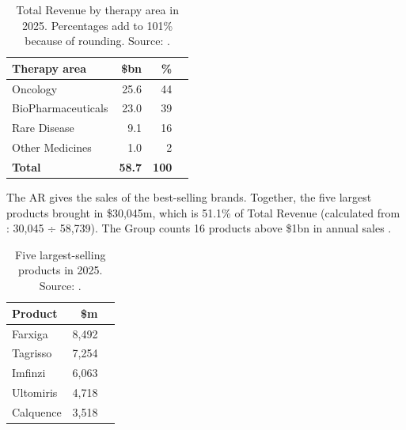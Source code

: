 \begin{table}[H]\centering
\caption{Total Revenue by therapy area in 2025. Percentages add to 101\% because of rounding. Source: \cite[p.~2]{AR}.}
\label{tab:receita-area}
\begin{tabular}{@{}lrrB@{}}
\toprule
\textbf{Therapy area} & \textbf{\$bn} & \textbf{\%} & \\
\midrule
Oncology            & 25.6 & 44 &  \\
BioPharmaceuticals  & 23.0 & 39 &  \\
Rare Disease        &  9.1 & 16 &  \\
Other Medicines     &  1.0 &  2 &  \\
\midrule
\textbf{Total}      & \textbf{58.7} & \textbf{100} & \\
\bottomrule
\end{tabular}
\end{table}
The AR gives the sales of the best-selling brands. Together, the five largest products brought in \$30,045m, which is 51.1\% of Total Revenue (calculated from \cite[p.~56]{AR}: 30,045 ÷ 58,739). The Group counts 16 products above \$1bn in annual sales \cite[p.~50]{AR}.

\begin{table}[H]\centering
\caption{Five largest-selling products in 2025. Source: \cite[p.~56]{AR}.}
\label{tab:top5}
\begin{tabular}{@{}lrB@{}}
\toprule
\textbf{Product} & \textbf{\$m} & \\
\midrule
Farxiga   & 8,492 &  \\
Tagrisso  & 7,254 &  \\
Imfinzi   & 6,063 &  \\
Ultomiris & 4,718 &  \\
Calquence & 3,518 &  \\
\bottomrule
\end{tabular}
\end{table}

